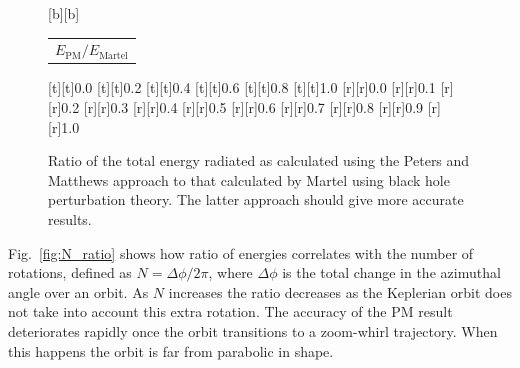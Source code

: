 \documentclass[aps,prd,reprint,showpacs,groupedaddress]{revtex4-1}
\newcommand{\Figref}[1]{Fig.~\ref{fig:#1}}
\begin{document}
\begin{figure}
{\begin{psfrags}
[b][b]{\color[rgb]{0,0,0}\setlength{\tabcolsep}{0pt}\begin{tabular}{c}{\Large$E_\text{PM}/E_\text{Martel}$}\end{tabular}}%
%
[t][t]{0.0}%
[t][t]{0.2}%
[t][t]{0.4}%
[t][t]{0.6}%
[t][t]{0.8}%
[t][t]{1.0}%
%
[r][r]{0.0}%
[r][r]{0.1}%
[r][r]{0.2}%
[r][r]{0.3}%
[r][r]{0.4}%
[r][r]{0.5}%
[r][r]{0.6}%
[r][r]{0.7}%
[r][r]{0.8}%
[r][r]{0.9}%
[r][r]{1.0}%
%
%
\end{psfrags}%
}
\caption{Ratio of the total energy radiated as calculated using the Peters and Matthews\cite{Peters1963} approach to that calculated by Martel\cite{Martel2004a} using black hole perturbation theory. The latter approach should give more accurate results.}
\end{figure}
\Figref{N_ratio} shows how ratio of energies correlates with the number of rotations, defined as $N = {\Delta \phi}/{2\pi}$, where $\Delta \phi$ is the total change in the azimuthal angle over an orbit. As $N$ increases the ratio decreases as the Keplerian orbit does not take into account this extra rotation. The accuracy of the PM result deteriorates rapidly once the orbit transitions to a zoom-whirl trajectory. When this happens the orbit is far from parabolic in shape.
\end{document}

